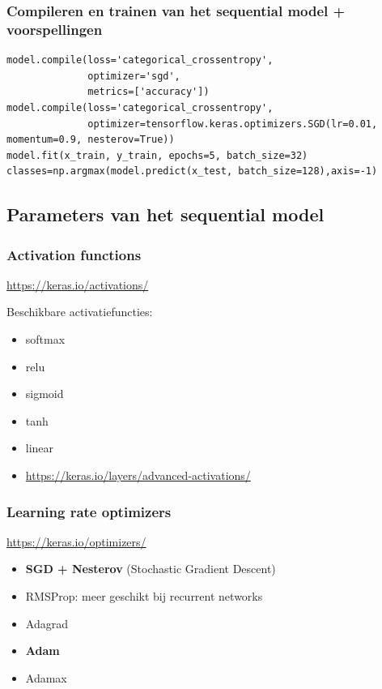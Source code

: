 \documentclass{article}
\begin{document}
\subsubsection{Compileren en trainen van het sequential model + voorspellingen}

\begin{verbatim}
model.compile(loss='categorical_crossentropy',
              optimizer='sgd',
              metrics=['accuracy'])
model.compile(loss='categorical_crossentropy',
              optimizer=tensorflow.keras.optimizers.SGD(lr=0.01, momentum=0.9, nesterov=True))
model.fit(x_train, y_train, epochs=5, batch_size=32)
classes=np.argmax(model.predict(x_test, batch_size=128),axis=-1)
\end{verbatim}

\subsection{Parameters van het sequential model}

\subsubsection{Activation functions}

\url{https://keras.io/activations/}

Beschikbare activatiefuncties:

\begin{itemize}
    \item softmax
    \item relu
    \item sigmoid
    \item tanh
    \item linear
    \item \url{https://keras.io/layers/advanced-activations/}
\end{itemize}

\subsubsection{Learning rate optimizers}

\url{https://keras.io/optimizers/}

\begin{itemize}
    \item \textbf{SGD + Nesterov} (Stochastic Gradient Descent)
    \item RMSProp: meer geschikt bij recurrent networks
    \item Adagrad
    \item \textbf{Adam}
    \item Adamax
\end{itemize}
\end{document}
